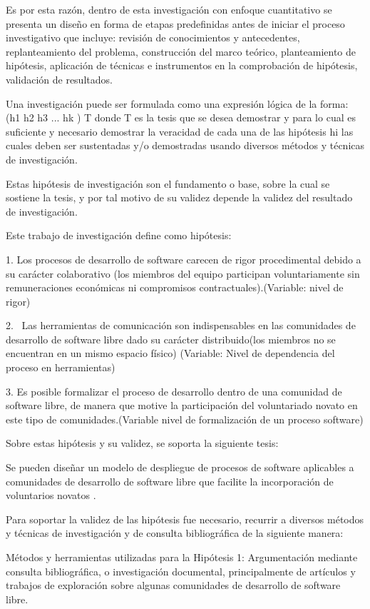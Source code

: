 Es por esta razón, dentro de esta investigación con enfoque cuantitativo se presenta un diseño en forma de etapas predefinidas antes de iniciar el proceso investigativo que incluye: revisión de conocimientos y antecedentes, replanteamiento del problema, construcción del marco teórico, planteamiento de hipótesis, aplicación de técnicas e instrumentos en la comprobación de hipótesis, validación de resultados.

Una investigación puede ser formulada como una expresión lógica de la forma: (h1  h2  h3 ... hk ) T donde T es la tesis que se desea demostrar y para lo cual es suficiente y necesario demostrar la veracidad de cada una de las hipótesis hi las cuales deben ser sustentadas y/o demostradas usando diversos métodos y técnicas de investigación.

Estas hipótesis de investigación son el fundamento o base, sobre la cual se sostiene la tesis, y por tal motivo de su validez depende la validez del resultado de investigación.

Este trabajo de investigación define como hipótesis:

1. Los procesos de desarrollo de software carecen de rigor procedimental debido a su carácter colaborativo (los miembros del equipo participan voluntariamente sin remuneraciones económicas ni compromisos contractuales).(Variable: nivel de rigor)

2. \ Las herramientas de comunicación son indispensables en las comunidades de desarrollo de software libre dado su carácter distribuido(los miembros no se encuentran en un mismo espacio físico) (Variable: Nivel de dependencia del proceso en herramientas)

3. Es posible formalizar el proceso de desarrollo dentro de una comunidad de software libre, de manera que motive la participación del voluntariado novato en este tipo de comunidades.(Variable nivel de formalización de un proceso software) 

Sobre estas hipótesis y su validez, se soporta la siguiente tesis:

Se pueden diseñar un modelo de despliegue de procesos de software aplicables a comunidades de desarrollo de software libre que facilite la incorporación de voluntarios novatos .

Para soportar la validez de las hipótesis fue necesario, recurrir a diversos métodos y técnicas de investigación y de consulta bibliográfica de la siguiente manera:

Métodos y herramientas utilizadas para la Hipótesis 1: Argumentación mediante consulta bibliográfica, o investigación documental, principalmente de artículos y trabajos de exploración sobre algunas comunidades de desarrollo de software libre.

